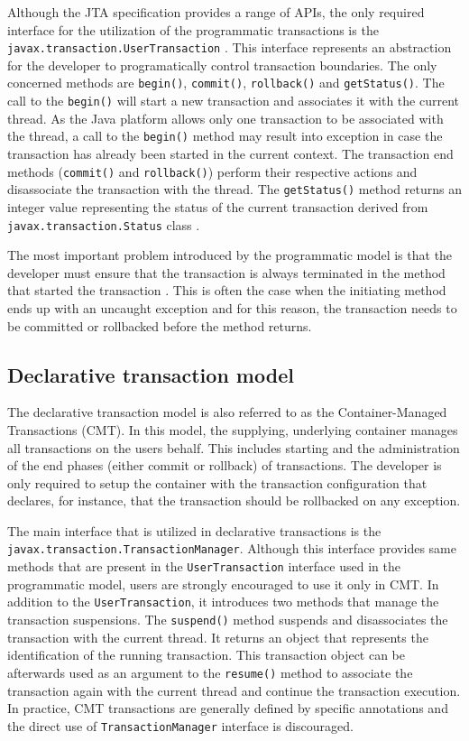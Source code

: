 \documentclass[oneside,
  digital, %
  table,   %
  nolof,     %
  nolot,     %
]{fithesis3}
\begin{document}
Although the JTA specification provides a range of APIs, the only required interface for the utilization of the programmatic transactions is the \texttt{javax.transaction.UserTransaction} \cite{jta}. This interface represents an abstraction for the developer to programatically control transaction boundaries. The only concerned methods are \texttt{begin()}, \texttt{commit()}, \texttt{rollback()} and \texttt{getStatus()}. The call to the \texttt{begin()} will start a new transaction and associates it with the current thread. As the Java platform allows only one transaction to be associated with the thread, a call to the \texttt{begin()} method may result into exception in case the transaction has already been started in the current context. The transaction end methods (\texttt{commit()} and \texttt{rollback()}) perform their respective actions and disassociate the transaction with the thread. The \texttt{getStatus()} method returns an integer value representing the status of the current transaction derived from  \texttt{javax.transaction.Status} class \cite{jta}.

The most important problem introduced by the programmatic model is that the developer must ensure that the transaction is always terminated in the method that started the transaction \cite{java_transaction_design_strategies}. This is often the case when  the initiating method ends up with an uncaught exception and for this reason, the transaction needs to be committed or rollbacked before the method returns.

\subsection{Declarative transaction model}
\label{sec:decl-tran-model}

The declarative transaction model is also referred to as the Container-Managed Transactions (CMT). In this model, the supplying, underlying container manages all transactions on the users behalf. This includes starting and the administration of the end phases (either commit or rollback) of transactions. The developer is only required to setup the container with the transaction configuration that declares, for instance, that the transaction should be rollbacked on any exception.

The main interface that is utilized in declarative transactions is the \texttt{javax.transaction.TransactionManager}. Although this interface provides  same methods that are present in the \texttt{UserTransaction} interface used in the programmatic model, users are strongly encouraged to use it only in CMT. In addition to the \texttt{UserTransaction}, it introduces two methods that manage the transaction suspensions. The \texttt{suspend()} method suspends and  disassociates the transaction with the current thread. It returns an object that represents the identification of the running transaction. This transaction object can be afterwards used as an argument to the \texttt{resume()} method to associate the transaction again with the current thread and continue the transaction execution. In practice, CMT transactions are generally defined by specific annotations and the direct use of \texttt{TransactionManager} interface is discouraged.
\end{document}

